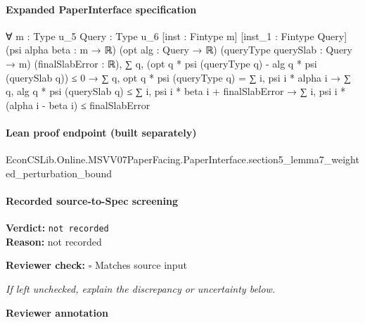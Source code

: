 \documentclass[10pt]{article}
\newcommand{\reviewerbox}{%
  \par\noindent\fbox{\parbox{0.96\linewidth}{\rule{0pt}{0.38in}}}\par
}
\newcommand{\reviewmatch}[1]{%
  \par\noindent\textbf{Reviewer check:} $\square$\; #1\par
  \noindent\emph{If left unchecked, explain the discrepancy or uncertainty below.}\par
}
\begin{document}
\paragraph{Expanded PaperInterface specification}
\begin{ReviewVerbatim}
∀ {m : Type u_5} {Query : Type u_6} [inst : Fintype m] [inst_1 : Fintype Query] (psi alpha beta : m → ℝ)
  (opt alg : Query → ℝ) (queryType querySlab : Query → m) (finalSlabError : ℝ),
  ∑ q, (opt q * psi (queryType q) - alg q * psi (querySlab q)) ≤ 0 →
    ∑ q, opt q * psi (queryType q) = ∑ i, psi i * alpha i →
      ∑ q, alg q * psi (querySlab q) ≤ ∑ i, psi i * beta i + finalSlabError →
        ∑ i, psi i * (alpha i - beta i) ≤ finalSlabError
\end{ReviewVerbatim}

\paragraph{Lean proof endpoint (built separately)}\begin{ReviewVerbatim}
EconCSLib.Online.MSVV07PaperFacing.PaperInterface.section5_lemma7_weighted_perturbation_bound
\end{ReviewVerbatim}

\paragraph{Recorded source-to-Spec screening}
\textbf{Verdict:} \texttt{not recorded}
\\
\textbf{Reason:} not recorded
\reviewmatch{Matches source input}
\noindent\textbf{Reviewer annotation}\par
\reviewerbox
\end{document}
